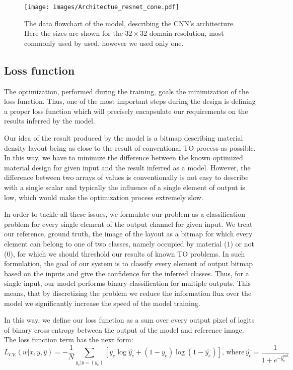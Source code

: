 \begin{figure}
	\centering
	\texttt{[image: images/Architectue\_resnet\_cone.pdf]}
	\label{fig:arch_1}
	\caption{The data flowchart of the model, describing the CNN's architecture. Here the sizes are shown for the $32 \times 32$ domain resolution, most commonly used by used, however we used only one.}
\end{figure}


\subsection{Loss function}

The optimization, performed during the training, goals the minimization of the loss function.
Thus, one of the most important steps during the design is defining a proper loss function which will precisely encapsulate our requirements on the results inferred by the model.
\medskip

Our idea of the result produced by the model is a bitmap describing material density layout being as close to the result of conventional TO process as possible.
In this way, we have to minimize the difference between the known optimized material design for given input and the result inferred as a model.
However, the difference between two arrays of values is conventionally is not easy to describe with a single scalar and typically the influence of a single element of output is low, which would make the optimization process extremely slow.
\medskip

In order to tackle all these issues, we formulate our problem as a classification problem for every single element of the output channel for given input. 
We treat our reference, ground truth, the image of the layout as a bitmap for which every element can belong to one of two classes, namely occupied by material ($1$)  or not ($0$), for which we should threshold our results of known TO problems.
In such formulation, the goal of our system is to classify every element of output bitmap based on the inputs and give the confidence for the inferred classes.
Thus, for a single input, our model performs binary classification for multiple outputs.
This means, that by discretizing the problem we reduce the information flux over the model we significantly increase the speed of the model training.
\medskip

In this way, we define our loss function as a sum over every output pixel of logits of binary cross-entropy between the output of the model and reference image.
The loss function term has the next form:
\begin{equation}
 L_{CE}(w|x, y, \hat{y}) = -\frac{1}{N} \sum_{y_{e}|y=(y_{e})}^{} [ y_{e} \log \hat{y_{e}} + (1-y_{e}) \log (1-\hat{y_{e}})] , \, \mathrm{where} \, \hat{y_{e}} = \frac{1}{1+e^{-\hat{y}^{out}_{e}}}
\end{equation}
\medskip

